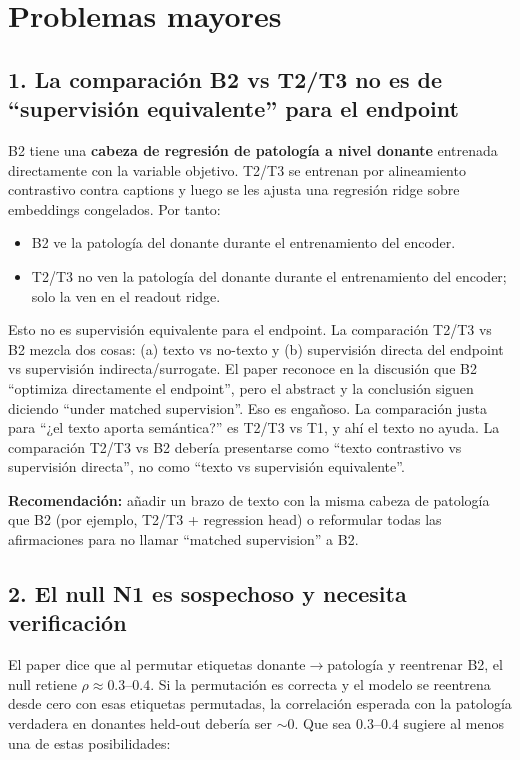 \documentclass[11pt,a4paper]{article}
\begin{document}
\section*{Problemas mayores}

\subsection*{1. La comparación B2 vs T2/T3 no es de ``supervisión equivalente'' para el endpoint}

B2 tiene una \textbf{cabeza de regresión de patología a nivel donante} entrenada directamente con la variable objetivo. T2/T3 se entrenan por alineamiento contrastivo contra captions y luego se les ajusta una regresión ridge sobre embeddings congelados. Por tanto:

\begin{itemize}
    \item B2 ve la patología del donante durante el entrenamiento del encoder.
    \item T2/T3 no ven la patología del donante durante el entrenamiento del encoder; solo la ven en el readout ridge.
\end{itemize}

Esto no es supervisión equivalente para el endpoint. La comparación T2/T3 vs B2 mezcla dos cosas: (a) texto vs no-texto y (b) supervisión directa del endpoint vs supervisión indirecta/surrogate. El paper reconoce en la discusión que B2 ``optimiza directamente el endpoint'', pero el abstract y la conclusión siguen diciendo ``under matched supervision''. Eso es engañoso. La comparación justa para ``¿el texto aporta semántica?'' es T2/T3 vs T1, y ahí el texto no ayuda. La comparación T2/T3 vs B2 debería presentarse como ``texto contrastivo vs supervisión directa'', no como ``texto vs supervisión equivalente''.

\textbf{Recomendación:} añadir un brazo de texto con la misma cabeza de patología que B2 (por ejemplo, T2/T3 + regression head) o reformular todas las afirmaciones para no llamar ``matched supervision'' a B2.

\subsection*{2. El null N1 es sospechoso y necesita verificación}

El paper dice que al permutar etiquetas donante$\rightarrow$patología y reentrenar B2, el null retiene $\rho \approx 0.3$--$0.4$. Si la permutación es correcta y el modelo se reentrena desde cero con esas etiquetas permutadas, la correlación esperada con la patología verdadera en donantes held-out debería ser $\sim 0$. Que sea $0.3$--$0.4$ sugiere al menos una de estas posibilidades:
\end{document}
